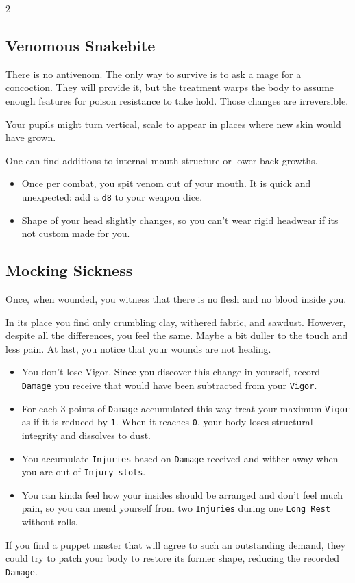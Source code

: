 

\begin{multicols*}{2}

\subsection*{Venomous Snakebite}

There is no antivenom. The only way to survive is to ask a mage for a concoction.
They will provide it, but the treatment warps the body to assume enough features for poison resistance to take hold.
Those changes are irreversible.

Your pupils might turn vertical, scale to appear in places where new skin would have grown.

One can find additions to internal mouth structure or lower back growths.

\begin{itemize}[nosep, leftmargin=*]
    \item Once per combat, you spit venom out of your mouth. It is quick and unexpected: add a \texttt{d8} to your weapon dice.
    \item Shape of your head slightly changes, so you can't wear rigid headwear if its not custom made for you.
\end{itemize}


\subsection*{Mocking Sickness}

Once, when wounded, you witness that there is no flesh and no blood inside you.

In its place you find only crumbling clay, withered fabric, and sawdust.
However, despite all the differences, you feel the same. Maybe a bit duller to the touch and less pain.
At last, you notice that your wounds are not healing.

\begin{itemize}[nosep, leftmargin=*]
    \item You don't lose Vigor. Since you discover this change in yourself, record \texttt{Damage} you receive that would have been subtracted from your \texttt{Vigor}.
    \item For each 3 points of \texttt{Damage} accumulated this way treat your maximum \texttt{Vigor} as if it is reduced by \texttt{1}. When it reaches \texttt{0}, your body loses structural integrity and dissolves to dust.
    \item You accumulate \texttt{Injuries} based on \texttt{Damage} received and wither away when you are out of \texttt{Injury slots}.
    \item You can kinda feel how your insides should be arranged and don't feel much pain, so you can mend yourself from two \texttt{Injuries} during one \texttt{Long Rest} without rolls.
\end{itemize}
If you find a puppet master that will agree to such an outstanding demand, they could try to patch your body to restore its former shape, reducing the recorded \texttt{Damage}.


\end{multicols*}
